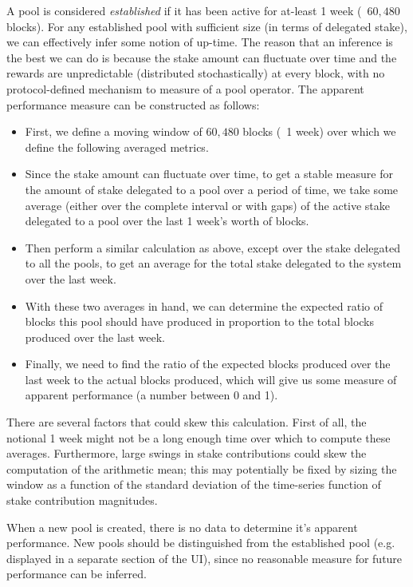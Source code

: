 A pool is considered \textit{established} if it has been active for at-least 1 week (~$60,480$ blocks). For any established pool with sufficient size (in terms of delegated stake), we can effectively infer some notion of up-time. The reason that an inference is the best we can do is because the stake amount can fluctuate over time and the rewards are unpredictable (distributed stochastically) at every block, with no protocol-defined mechanism to measure  of a pool operator. The apparent performance measure can be constructed as follows: 
\begin{itemize}[label=--,nosep]
    \item First, we define a moving window of $60,480$ blocks (~1 week) over which we define the following averaged metrics.
    \item Since the stake amount can fluctuate over time, to get a stable measure for the amount of stake delegated to a pool over a period of time, we take some average (either over the complete interval or with gaps) of the active stake delegated to a pool over the last 1 week's worth of blocks.
    \item Then perform a similar calculation as above, except over the stake delegated to all the pools, to get an average for the total stake delegated to the system over the last week.
    \item With these two averages in hand, we can determine the expected ratio of blocks this pool should have produced in proportion to the total blocks produced over the last week. 
    \item Finally, we need to find the ratio of the expected blocks produced over the last week to the actual blocks produced, which will give us some measure of apparent performance (a number between 0 and 1).  
\end{itemize}

There are several factors that could skew this calculation. First of all, the notional 1 week might not be a long enough time over which to compute these averages. Furthermore, large swings in stake contributions could skew the computation of the arithmetic mean; this may potentially be fixed by sizing the window as a function of the standard deviation of the time-series function of stake contribution magnitudes. 

When a new pool is created, there is no data to determine it's apparent performance. New pools should be distinguished from the established pool (e.g. displayed in a separate section of the UI), since no reasonable measure for future performance can be inferred. 

